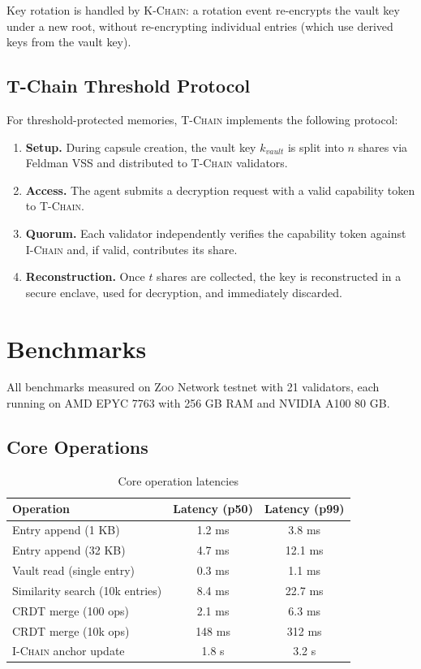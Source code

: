 \documentclass[11pt,letterpaper]{article}
\theoremstyle{definition}
\theoremstyle{remark}
\newcommand{\Zoo}{\textsc{Zoo}}
\newcommand{\IChain}{\textsc{I-Chain}}
\newcommand{\KChain}{\textsc{K-Chain}}
\newcommand{\TChain}{\textsc{T-Chain}}
\begin{document}
Key rotation is handled by \KChain{}: a rotation event re-encrypts the vault key under a new root, without re-encrypting individual entries (which use derived keys from the vault key).

\subsection{T-Chain Threshold Protocol}

For threshold-protected memories, \TChain{} implements the following protocol:

\begin{enumerate}
    \item \textbf{Setup.} During capsule creation, the vault key $k_{\textit{vault}}$ is split into $n$ shares via Feldman VSS and distributed to \TChain{} validators.
    \item \textbf{Access.} The agent submits a decryption request with a valid capability token to \TChain{}.
    \item \textbf{Quorum.} Each validator independently verifies the capability token against \IChain{} and, if valid, contributes its share.
    \item \textbf{Reconstruction.} Once $t$ shares are collected, the key is reconstructed in a secure enclave, used for decryption, and immediately discarded.
\end{enumerate}

\section{Benchmarks}
\label{sec:benchmarks}

All benchmarks measured on \Zoo{} Network testnet with 21 validators, each running on AMD EPYC 7763 with 256 GB RAM and NVIDIA A100 80 GB.

\subsection{Core Operations}

\begin{table}[h]
\centering
\begin{tabular}{lcc}
\toprule
\textbf{Operation} & \textbf{Latency (p50)} & \textbf{Latency (p99)} \\
\midrule
Entry append (1 KB) & 1.2 ms & 3.8 ms \\
Entry append (32 KB) & 4.7 ms & 12.1 ms \\
Vault read (single entry) & 0.3 ms & 1.1 ms \\
Similarity search (10k entries) & 8.4 ms & 22.7 ms \\
CRDT merge (100 ops) & 2.1 ms & 6.3 ms \\
CRDT merge (10k ops) & 148 ms & 312 ms \\
\IChain{} anchor update & 1.8 s & 3.2 s \\
\bottomrule
\end{tabular}
\caption{Core operation latencies}
\label{tab:core_bench}
\end{table}
\end{document}
